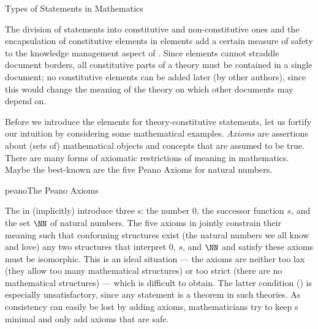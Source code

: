 \begin{omgroup}[id=statements-constitutive]{Types of Statements in Mathematics}
\begin{module}[id=statementtypes]
The division of statements into constitutive and non-constitutive ones and the
encapsulation of constitutive elements in  elements add a certain
measure of safety to the knowledge management aspect of \omdoc.  Since {\xml} elements
cannot straddle document borders, all constitutive parts of a theory must be contained in
a single document; no constitutive elements can be added later (by other authors), since
this would change the meaning of the theory on which other documents may depend on.
  
Before we introduce the \omdoc elements for theory-constitutive statements, let us
fortify our intuition by considering some mathematical examples.  {\emph{Axioms}} are
assertions about (sets of) mathematical objects and concepts that are assumed to be
true. There are many forms of axiomatic restrictions of meaning in mathematics. Maybe the
best-known are the five Peano Axioms for natural numbers.

\begin{myfig}{peano}{The Peano Axioms}
\end{myfig}

\begin{omtext}
The {} in {} (implicitly) introduce three
{s}: the number 0, the successor function $s$, and the set $\NN$ of
natural numbers. The five axioms in {} jointly constrain their meaning
such that conforming structures exist (the natural numbers we all know and love) any two
structures that interpret 0, $s$, and $\NN$ and satisfy these axioms must be isomorphic.
This is an ideal situation --- the axioms are neither too lax (they allow too many
mathematical structures) or too strict (there are no mathematical structures) --- which is
difficult to obtain. The latter condition () is
especially unsatisfactory, since any statement is a theorem in such theories. As
consistency can easily be lost by adding axioms, mathematicians try to keep
{s} minimal and only add axioms that are safe.
\end{omtext}


\end{module}
\end{omgroup}
